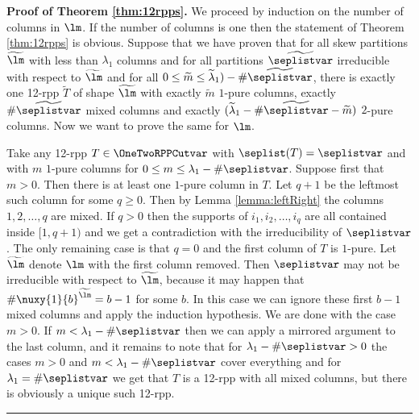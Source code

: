 \documentclass[numbers=enddot,12pt,final,onecolumn,notitlepage]{scrartcl}%
\theoremstyle{definition}
\newenvironment{proof}[1][Proof]{\noindent\textbf{#1.} }{\ \rule{0.5em}{0.5em}}
\begin{document}
\begin{proof}[Proof of Theorem \ref{thm:12rpps}]
We proceed by induction on the number of columns in $\lm$. If the number of columns is one then the statement of Theorem \ref{thm:12rpps} is obvious. Suppose that we have proven that for all skew partitions $\widetilde{\lm}$ with less than $\lambda_1$ columns and for all partitions $\widetilde\seplistvar$  irreducible with respect to $\widetilde{\lm}$ and for all $0\leq \widetilde m\leq \widetilde{\lambda}_1)-\#\widetilde\seplistvar$, there is exactly one 12-rpp $\widetilde T$ of shape $\widetilde{\lm}$ with exactly $\widetilde m$ $1$-pure columns, exactly $\#\widetilde\seplistvar$ mixed columns and exactly $(\widetilde{\lambda}_1-\#\widetilde\seplistvar-\widetilde m)$ $2$-pure columns. Now we want to prove the same for $\lm$.

Take any 12-rpp $T\in\OneTwoRPPCutvar$ with $\seplist(T)=\seplistvar$ and with $m$ $1$-pure columns for $0\leq m\leq \lambda_1-\#\seplistvar$. Suppose first that $m>0$. Then there is at least one $1$-pure column in $T$. Let $q+1$ be the leftmost such column for some $q\geq 0$. Then by Lemma \ref{lemma:leftRight} the columns $1,2,\dots,q$ are mixed. If $q>0$ then the supports of $i_1,i_2,\dots,i_q$ are all contained inside $[1,q+1)$ and we get a contradiction with the irreducibility of $\seplistvar$. The only remaining case is that $q=0$ and the first column of $T$ is $1$-pure. Let $\widetilde\lm$ denote $\lm$ with the first column removed. Then $\seplistvar$ may not be irreducible with respect to $\widetilde{\lm}$, because it may happen that $\#\nuxy{1}{b}^{\widetilde{\lm}}=b-1$ for some $b$. In this case we can ignore these first $b-1$ mixed columns and apply the induction hypothesis. We are done with the case $m>0$. If $m<\lambda_1-\#\seplistvar$ then we can apply a mirrored argument to the last column, and it remains to note that for $\lambda_1-\#\seplistvar>0$ the cases $m>0$ and $m<\lambda_1-\#\seplistvar$ cover everything and for $\lambda_1=\#\seplistvar$ we get that $T$ is a 12-rpp with all mixed columns, but there is obviously a unique such 12-rpp.
\end{proof}
\end{document}
